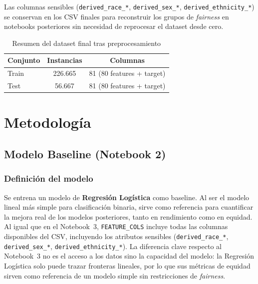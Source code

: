 \documentclass[11pt,a4paper]{article}
\begin{document}
Las columnas sensibles (\texttt{derived\_race\_*}, \texttt{derived\_sex\_*},
\texttt{derived\_ethnicity\_*}) se conservan en los CSV finales para reconstruir los grupos de
\textit{fairness} en notebooks posteriores sin necesidad de reprocesar el dataset desde cero.

\begin{table}[ht]
\centering
\caption{Resumen del dataset final tras preprocesamiento}
\label{tab:dataset_final}
\small
\begin{tabular}{@{}lcc@{}}
\toprule
\textbf{Conjunto} & \textbf{Instancias} & \textbf{Columnas} \\ \midrule
Train & 226.665 & 81 (80 features + target) \\
Test  & 56.667  & 81 (80 features + target) \\
\bottomrule
\end{tabular}
\end{table}

\newpage
\section{Metodología}
\label{sec:metodologia}

\subsection{Modelo Baseline (Notebook 2)}

\subsubsection{Definición del modelo}

Se entrena un modelo de \textbf{Regresión Logística} como baseline. Al ser el modelo lineal más
simple para clasificación binaria, sirve como referencia para cuantificar la mejora real de los
modelos posteriores, tanto en rendimiento como en equidad. Al igual que en el Notebook~3,
\texttt{FEATURE\_COLS} incluye todas las columnas disponibles del CSV, incluyendo los atributos
sensibles (\texttt{derived\_race\_*}, \texttt{derived\_sex\_*}, \texttt{derived\_ethnicity\_*}).
La diferencia clave respecto al Notebook~3 no es el acceso a los datos sino la capacidad del
modelo: la Regresión Logística solo puede trazar fronteras lineales, por lo que sus métricas de
equidad sirven como referencia de un modelo simple sin restricciones de \textit{fairness}.
\end{document}
